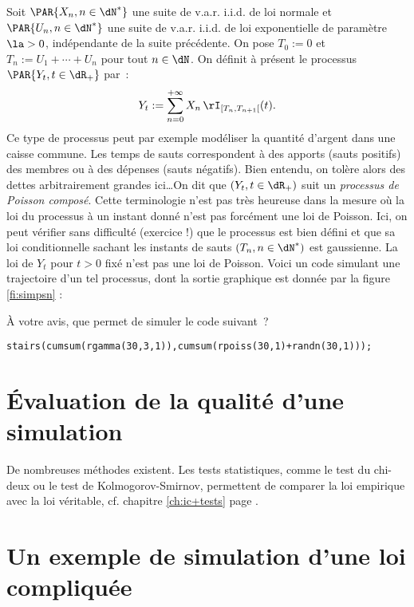 Soit $\PAR{X_n,n\in\dN^*}$ une suite de v.a.r. i.i.d. de loi normale et
$\PAR{U_n,n\in\dN^*}$ une suite de v.a.r. i.i.d. de loi exponentielle de
paramètre $\la>0$, indépendante de la suite précédente. On pose $T_0:=0$ et
$T_n:=U_1+\cdots+U_n$ pour tout $n\in\dN\*$. On définit à présent le processus
$\PAR{Y_t,t\in\dR_+}$ par~:
$$
Y_t:=\sum_{n=0}^{+\infty} X_n\,\rI_{[T_n,T_{n+1}[}(t).
$$
Ce type de processus peut par exemple modéliser la quantité d'argent dans
une caisse commune. Les temps de sauts correspondent à des apports (sauts
positifs) des membres ou à des dépenses (sauts négatifs). Bien entendu, on
tolère alors des dettes arbitrairement grandes ici\ldots On dit que
$(Y_t,t\in\dR_+)$ suit un \emph{processus de Poisson composé}.  Cette
terminologie n'est pas très heureuse dans la mesure où la loi du processus à
un instant donné n'est pas forcément une loi de Poisson. Ici, on peut vérifier
sans difficulté (exercice !) que le processus est bien défini et que sa loi
conditionnelle sachant les instants de sauts $(T_n,n\in\dN^*)$ est gaussienne.
La loi de $Y_t$ pour $t>0$ fixé n'est pas une loi de Poisson. Voici un code
\ML{} simulant une trajectoire d'un tel processus, dont la sortie graphique
est donnée par la figure \ref{fi:simpsn} :
%
%
%
\begin{exo}
  À votre avis, que permet de simuler le code suivant~?
  \begin{center}
    \texttt{stairs(cumsum(rgamma(30,3,1)),cumsum(rpoiss(30,1)+randn(30,1)));}
  \end{center}
\end{exo}

%
\section{Évaluation de la qualité d'une simulation}
%

De nombreuses méthodes existent. Les tests statistiques, comme le test du
chi-deux ou le test de Kolmogorov-Smirnov, permettent de comparer la loi
empirique avec la loi véritable, cf. chapitre \ref{ch:ic+tests} page
\pageref{ch:ic+tests}. 

%
\section{Un exemple de simulation d'une loi compliquée}
%


